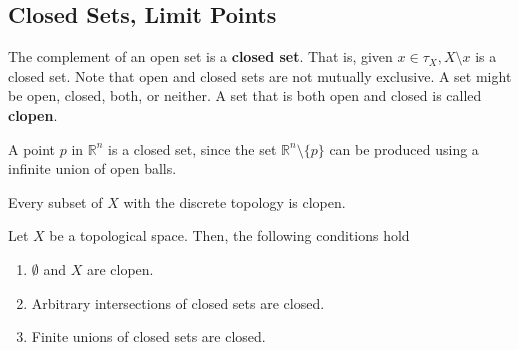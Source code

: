 \documentclass{article}
\begin{document}
  \subsection{Closed Sets, Limit Points}

    \begin{definition}
    The complement of an open set is a \textbf{closed set}. That is, given $x \in \tau_{X}, X \setminus x$ is a closed set. Note that open and closed sets are not mutually exclusive. A set might be open, closed, both, or neither. A set that is both open and closed is called \textbf{clopen}.
    \end{definition}

    \begin{example}
    A point $p$ in $\mathbb{R}^{n}$ is a closed set, since the set $\mathbb{R}^{n} \setminus \{p\}$ can be produced using a infinite union of open balls. 
    \end{example}

    \begin{example}
    Every subset of $X$ with the discrete topology is clopen.
    \end{example}

    \begin{theorem}
    Let $X$ be a topological space. Then, the following conditions hold
    \begin{enumerate}
        \item $\emptyset$ and $X$ are clopen.
        \item Arbitrary intersections of closed sets are closed. 
        \item Finite unions of closed sets are closed. 
    \end{enumerate}
    \end{theorem}
\end{document}
